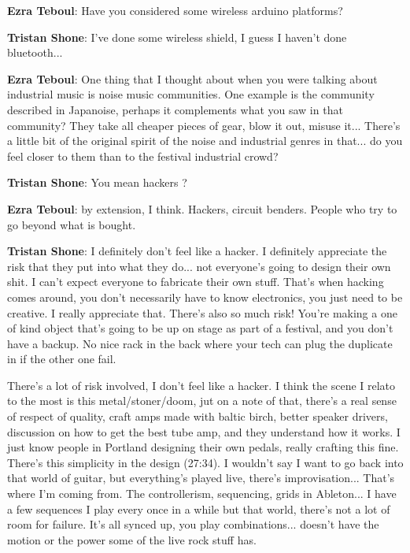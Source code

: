 \textbf{Ezra Teboul}: Have you considered some wireless arduino platforms? 

\textbf{Tristan Shone}: I've done some wireless shield, I guess I haven't done bluetooth...

\textbf{Ezra Teboul}: One thing that I thought about when you were talking about industrial music is noise music communities. One example is the community described in Japanoise, perhaps it complements what you saw in that community? They take all cheaper pieces of gear, blow it out, misuse it... There's a little bit of the original spirit of the noise and industrial genres in that... do you feel closer to them than to the festival industrial crowd? 

\textbf{Tristan Shone}: You mean hackers ? 

\textbf{Ezra Teboul}: by extension, I think. Hackers, circuit benders. People who try to go beyond what is bought. 

\textbf{Tristan Shone}: I definitely don't feel like a hacker. I definitely appreciate the risk that they put into what they do... not everyone's going to design their own shit. I can't expect everyone to fabricate their own stuff. That's when hacking comes around, you don't necessarily have to know electronics, you just need to be creative. I really appreciate that. There's also so much risk! You're making a one of kind object that's going to be up on stage as part of a festival, and you don't have a backup. No nice rack in the back where your tech can plug the duplicate in if the other one fail. 

There's a lot of risk involved, I don't feel like a hacker. I think the scene I relato to the most is this metal/stoner/doom, jut on a note of that, there's a real sense of respect of quality, craft amps made with baltic birch, better speaker  drivers, discussion on how to get the best tube amp, and they understand how it works. I just know people in Portland designing their own pedals, really crafting this fine. There's this simplicity in the design (27:34). I wouldn't say I want to go back into that world of guitar, but everything's played live, there's improvisation... That's where I'm coming from. The controllerism, sequencing, grids in Ableton... I have a few sequences I play every once in a while but that world, there's not a lot of room for failure. It's all synced up, you play combinations... doesn't have the motion or the power some of the live rock stuff has. 

